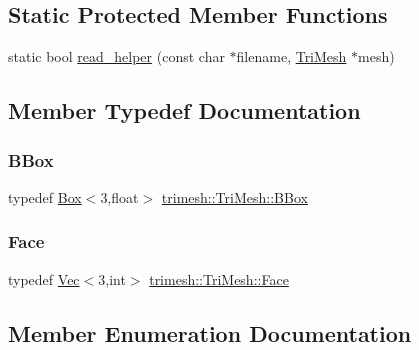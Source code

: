 \subsection*{Static Protected Member Functions}
\begin{DoxyCompactItemize}
\item 
static bool \hyperlink{classtrimesh_1_1TriMesh_a7157944d3f98868565e8ad9312c89ac4}{read\+\_\+helper} (const char $\ast$filename, \hyperlink{classtrimesh_1_1TriMesh}{Tri\+Mesh} $\ast$mesh)
\end{DoxyCompactItemize}


\subsection{Member Typedef Documentation}
\mbox{\label{classtrimesh_1_1TriMesh_a32708e131e1ccac6238a226edf5a43f6}} 
\subsubsection{\texorpdfstring{B\+Box}{BBox}}
{\footnotesize\ttfamily typedef \hyperlink{classtrimesh_1_1Box}{Box}$<$3,float$>$ \hyperlink{classtrimesh_1_1TriMesh_a32708e131e1ccac6238a226edf5a43f6}{trimesh\+::\+Tri\+Mesh\+::\+B\+Box}}

\mbox{\label{classtrimesh_1_1TriMesh_a06cb64bb6435d5cf4d7b24d2950fe8e7}} 
\subsubsection{\texorpdfstring{Face}{Face}}
{\footnotesize\ttfamily typedef \hyperlink{classtrimesh_1_1Vec}{Vec}$<$3,int$>$ \hyperlink{classtrimesh_1_1TriMesh_a06cb64bb6435d5cf4d7b24d2950fe8e7}{trimesh\+::\+Tri\+Mesh\+::\+Face}}



\subsection{Member Enumeration Documentation}
\mbox{\label{classtrimesh_1_1TriMesh_a012e9ee703bc64de2b99aa0cb695af4b}} 
